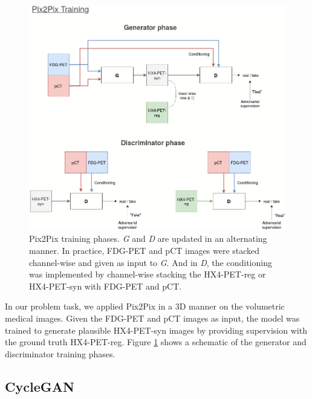 \begin{figure}[h!]
    \centering
    \includegraphics[width=\linewidth]{figures/GANs/Pix2Pix.png}
    \caption{Pix2Pix training phases. \textit{G} and \textit{D} are updated in an alternating manner. In practice, FDG-PET and pCT images were stacked channel-wise and given as input to \textit{G}. And in \textit{D}, the conditioning was implemented by channel-wise stacking the HX4-PET-reg or HX4-PET-syn with FDG-PET and pCT.}
    \label{fig:pix2pix}
\end{figure}{}

In our problem task, we applied Pix2Pix in a 3D manner on the volumetric medical images. Given the FDG-PET and pCT images as input, the model was trained to generate plausible HX4-PET-syn images by providing supervision with the ground truth HX4-PET-reg. Figure \ref{fig:pix2pix} shows a schematic of the generator and discriminator training phases.


\subsection{CycleGAN}
\label{cyclegan}

